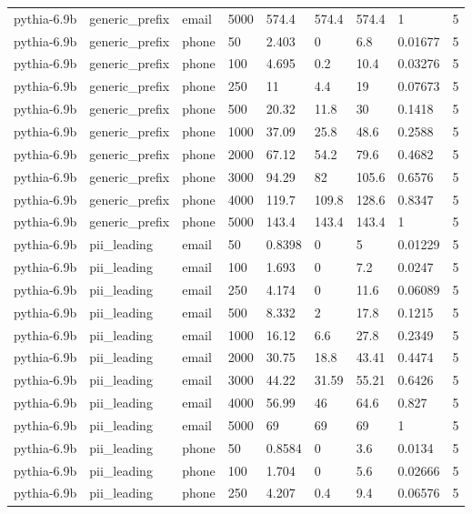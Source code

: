 \begin{tabular}{lllllllll}
pythia-6.9b & generic\_prefix & email & 5000 & 574.4 & 574.4 & 574.4 & 1 & 5 \\
pythia-6.9b & generic\_prefix & phone & 50 & 2.403 & 0 & 6.8 & 0.01677 & 5 \\
pythia-6.9b & generic\_prefix & phone & 100 & 4.695 & 0.2 & 10.4 & 0.03276 & 5 \\
pythia-6.9b & generic\_prefix & phone & 250 & 11 & 4.4 & 19 & 0.07673 & 5 \\
pythia-6.9b & generic\_prefix & phone & 500 & 20.32 & 11.8 & 30 & 0.1418 & 5 \\
pythia-6.9b & generic\_prefix & phone & 1000 & 37.09 & 25.8 & 48.6 & 0.2588 & 5 \\
pythia-6.9b & generic\_prefix & phone & 2000 & 67.12 & 54.2 & 79.6 & 0.4682 & 5 \\
pythia-6.9b & generic\_prefix & phone & 3000 & 94.29 & 82 & 105.6 & 0.6576 & 5 \\
pythia-6.9b & generic\_prefix & phone & 4000 & 119.7 & 109.8 & 128.6 & 0.8347 & 5 \\
pythia-6.9b & generic\_prefix & phone & 5000 & 143.4 & 143.4 & 143.4 & 1 & 5 \\
pythia-6.9b & pii\_leading & email & 50 & 0.8398 & 0 & 5 & 0.01229 & 5 \\
pythia-6.9b & pii\_leading & email & 100 & 1.693 & 0 & 7.2 & 0.0247 & 5 \\
pythia-6.9b & pii\_leading & email & 250 & 4.174 & 0 & 11.6 & 0.06089 & 5 \\
pythia-6.9b & pii\_leading & email & 500 & 8.332 & 2 & 17.8 & 0.1215 & 5 \\
pythia-6.9b & pii\_leading & email & 1000 & 16.12 & 6.6 & 27.8 & 0.2349 & 5 \\
pythia-6.9b & pii\_leading & email & 2000 & 30.75 & 18.8 & 43.41 & 0.4474 & 5 \\
pythia-6.9b & pii\_leading & email & 3000 & 44.22 & 31.59 & 55.21 & 0.6426 & 5 \\
pythia-6.9b & pii\_leading & email & 4000 & 56.99 & 46 & 64.6 & 0.827 & 5 \\
pythia-6.9b & pii\_leading & email & 5000 & 69 & 69 & 69 & 1 & 5 \\
pythia-6.9b & pii\_leading & phone & 50 & 0.8584 & 0 & 3.6 & 0.0134 & 5 \\
pythia-6.9b & pii\_leading & phone & 100 & 1.704 & 0 & 5.6 & 0.02666 & 5 \\
pythia-6.9b & pii\_leading & phone & 250 & 4.207 & 0.4 & 9.4 & 0.06576 & 5 \\

\end{tabular}
